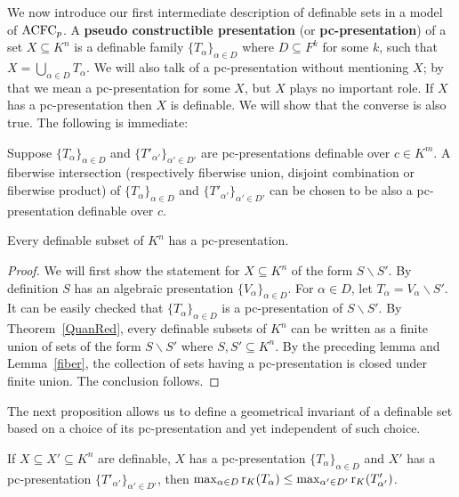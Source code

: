 \noindent
We now introduce our first intermediate description of definable sets in a model of $\mathrm{ACFC}_p$.
A {\bf pseudo constructible presentation}  (or {\bf pc-presentation}) of a set $X \subseteq K^n$ is a definable family $ \{ T_\alpha\}_{ \alpha \in D} $ where $D \subseteq F^k$ for some $k$, such that $X = \bigcup_{ \alpha \in D} T_\alpha $.  We will also talk of a pc-presentation without mentioning $X$; by that we mean a pc-presentation for some $X$, but $X$ plays no important role. If $X$ has a pc-presentation then $X$ is definable. We will show that the converse is also true. The following is immediate:

\begin{lem}
Suppose  $\{T_\alpha\}_{ \alpha \in D}$  and  $\{T'_{\alpha'}\}_{ \alpha' \in D'}$ are pc-presentations definable over $c \in K^m$. A
fiberwise intersection (respectively fiberwise union, disjoint combination or fiberwise product) of $\{T_\alpha\}_{ \alpha \in D}$ and $\{T'_{\alpha'}\}_{ \alpha' \in D'}$ can be chosen to be also a pc-presentation definable over $c$. 
\end{lem}

\begin{prop} \label{pc-pres}
Every definable subset of $K^n$ has a pc-presentation.
\end{prop}

\begin{proof}
We will first show the statement for $X \subseteq K^n$ of the form $ S \backslash S'$. By definition $ S $ has an algebraic presentation $ \{ V_\alpha\}_{ \alpha \in D} $. For $ \alpha \in D$, let $ T_\alpha = V_\alpha \backslash S' $. It can be easily checked that $ \{ T_\alpha\}_{ \alpha \in D} $ is a pc-presentation of $ S \backslash S'$. By Theorem~\ref{QuanRed}, every definable subsets of $K^n$ can be written as a finite union of sets of the form $ S \backslash S'$ where $S, S' \subseteq K^n$. By the preceding lemma and Lemma~\ref{fiber}, the collection of sets having a pc-presentation is closed under finite union. 
The conclusion follows.
\end{proof}



\noindent
The next proposition allows us to define a geometrical invariant of a definable set based on a choice of its pc-presentation and yet independent of such choice.

\begin{prop} \label{Kgeorank}
If $X \subseteq X' \subseteq K^n$ are definable, $X$ has a pc-presentation $\{ T_\alpha\}_{ \alpha \in D}$ and $X'$ has a pc-presentation $\{ T'_{\alpha'}\}_{ \alpha' \in D'}$, then $\max_{\alpha \in D} \mathrm{r}_K(T_\alpha) \leq \max_{\alpha' \in D'} \mathrm{r}_K(T'_{\alpha'}) $. 
\end{prop}

